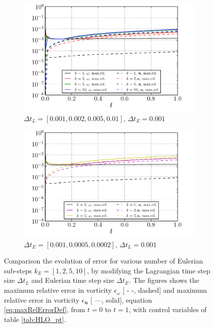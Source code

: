 	\begin{figure}[!h]
     \centering
     \begin{subfigure}[t]{0.45\textwidth}
             \includegraphics[width=\linewidth]{./figures/hybrid/lambOseen/lambOseen_parameter_k.pdf}
             \caption{$\Delta t_L = [0.001,0.002,0.005,0.01]$, $\Delta t_E = 0.001$}
             \label{fig:lambOseen_parameter_k_dtL}
     \end{subfigure}     
     \qquad
     \begin{subfigure}[t]{0.45\textwidth}
             \includegraphics[width=\linewidth]{./figures/hybrid/lambOseen/lambOseen_parameter_k_dtE.pdf}
             \caption{$\Delta t_E = [0.001,0.0005,0.0002]$, $\Delta t_L = 0.001$}
             \label{fig:lambOseen_parameter_k_dtE}
     \end{subfigure}        
     
     \caption{Comparison the evolution of error for various number of Eulerian sub-steps $k_E = [1,2,5,10]$, by modifying the Lagrangian time step size $\Delta t_L$ and Eulerian time step size $\Delta t_E$. The figures shows the maximum relative error in vorticity $\epsilon_{\omega}$ [ - -, dashed] and maximum relative error in vorticity $\epsilon_{\mathbf{u}}$ [ ---, solid], equation \ref{eq:maxRelErrorDef}, from $t=0$ to $t=1$, with control variables of table \ref{tab:HLO_pt}.}
     \label{fig:lambOseen_parameter_k}
	\end{figure}	

